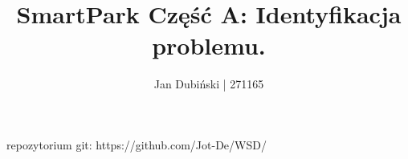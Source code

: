\documentclass[
    left=2.5cm,         %
    right=2.5cm,        %
    top=2.5cm,          %
    bottom=3cm,         %
    bindingoffset=6mm,  %
    nohyphenation=false %
]{eiti/eiti-thesis}
\begin{document}
\MasterThesis %
\title{
    SmartPark
    \break
    Część A: Identyfikacja problemu.
}
\subject{Wieloagentowe Systemy Decyzyjne}
\author{Jan Dubiński | 271165}
\date{\the\year}
\maketitle

repozytorium git:  https://github.com/Jot-De/WSD/

\hfill \break

\thispagestyle{empty}
\tableofcontents





\clearpage
\newpage


\printbibliography

\newpage


\listoffigures              %
\vspace{1cm}                %
\listoftables               %
\vspace{1cm}                %





\end{document}
